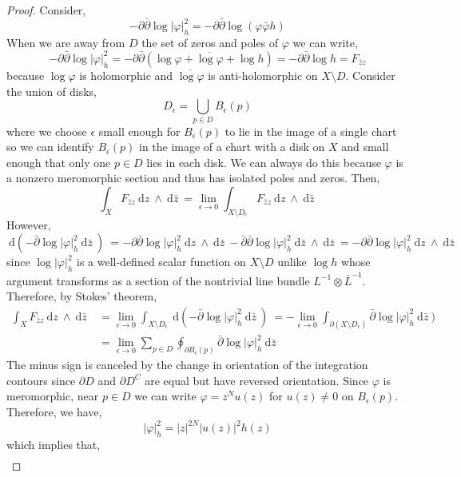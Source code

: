 \documentclass[12pt]{extarticle}
\renewcommand{\d}[1]{\: \mathrm{d}#1 \:}
\theoremstyle{definition}
\begin{document}
\begin{proof}
Consider,
\[ - \partial \bar{\partial} \log{|\varphi|_h^2} = - \partial \bar{\partial} \log{(\varphi \bar{\varphi} h)} \]
When we are away from $D$ the set of zeros and poles of $\varphi$ we can write,
\[ - \partial \bar{\partial} \log{|\varphi|_h^2} = - \partial \bar{\partial} \left( \log{\varphi} + \overline{\log{\varphi}} + \log{h} \right) = - \partial \bar{\partial} \log{h} = F_{\bar{z} z} \]
because $\log{\varphi}$ is holomorphic and $\overline{\log{\varphi}}$ is anti-holomorphic on $X \setminus D$. Consider the union of disks,
\[ D_{\epsilon} = \bigcup_{p \in D} B_{\epsilon}(p) \] 
where we choose $\epsilon$ small enough for $B_{\epsilon}(p)$ to lie in the image of a single chart so we can identify $B_{\epsilon}(p)$ in the image of a chart with a disk on $X$ and small enough that only one $p \in D$ lies in each disk. We can always do this because $\varphi$ is a nonzero meromorphic section and thus has isolated poles and zeros. Then,
\[ \int_X F_{\bar{z} z} \d{z} \wedge \d{\bar{z}} = \lim_{\epsilon \to 0} \int_{X \setminus D_{\epsilon}} F_{\bar{z} z} \d{z} \wedge \d{\bar{z}} \]
However, 
\[ \d{(-\bar{\partial} \log{|\varphi|_h^2} \d{\bar{z}})} = - \partial \bar{\partial} \log{|\varphi|_h^2} \d{z} \wedge \d{\bar{z}} - \bar{\partial} \bar{\partial} \log{|\varphi|_h^2} \d{\bar{z}} \wedge \d{\bar{z}} = - \partial \bar{\partial} \log{|\varphi|_h^2} \d{z} \wedge \d{\bar{z}} \]
since $\log{|\varphi|_h^2}$ is a well-defined scalar function on $X \setminus D$ unlike $\log{h}$ whose argument transforms as a section of the nontrivial line bundle $L^{-1} \otimes \bar{L}^{-1}$. Therefore, by Stokes' theorem,
\begin{align*}
\int_X F_{\bar{z} z} \d{z} \wedge \d{\bar{z}} & = \lim_{\epsilon \to 0} \int_{X \setminus D_{\epsilon}} \d{(-\bar{\partial} \log{|\varphi|_h^2} \d{\bar{z}})} 
= - \lim_{\epsilon \to 0} \int_{\partial (X \setminus D_{\epsilon})}\bar{\partial} \log{|\varphi|_h^2} \d{\bar{z}})
\\
& = \lim_{\epsilon \to 0} \sum_{p \in D} \oint_{\partial B_{\epsilon}(p)} \bar{\partial} \log{|\varphi|_h^2} \d{\bar{z}}
\end{align*}
The minus sign is canceled by the change in orientation of the integration contours since $\partial D$ and $\partial D^C$ are equal but have reversed orientation.
Since $\varphi$ is meromorphic, near $p \in D$ we can write $\varphi = z^N u(z)$ for $u(z) \neq 0$ on $B_{\epsilon}(p)$. Therefore, we have,
\[ |\varphi|_h^2 = |z|^{2N} |u(z)|^2 h(z) \]
which implies that,
\begin{align*}

\end{align*}
\end{proof}
\end{document}
